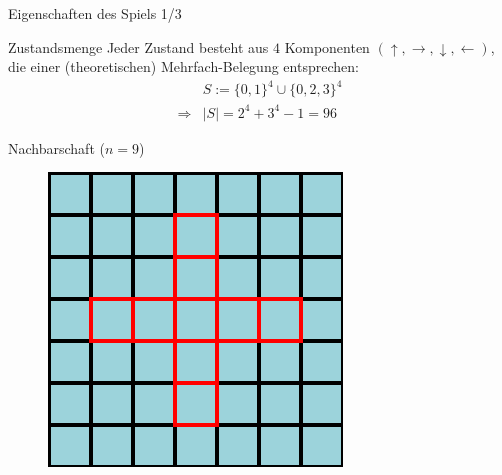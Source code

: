\documentclass[aspectratio=169]{beamer}
\begin{document}
  \begin{frame}{Eigenschaften des Spiels 1/3}
    \begin{block}{Zustandsmenge}
      Jeder Zustand besteht aus $4$ Komponenten $(\uparrow, \rightarrow, \downarrow, \leftarrow)$, die einer (theoretischen) Mehrfach-Belegung entsprechen:
      \begin{align*}
        & S := \{0,1\}^4 \cup \{0,2,3\}^{4} \\
        \Rightarrow & |S| = 2^4 + 3^4 -1 = 96
      \end{align*}

    \end{block}

    \pause

    \begin{block}{Nachbarschaft ($n=9$)}
      \begin{figure}[H]
          \centering
          \includegraphics[width = 0.2 \textheight]{neighborhood.png}
      \end{figure}

    \end{block}
  \end{frame}
\end{document}
